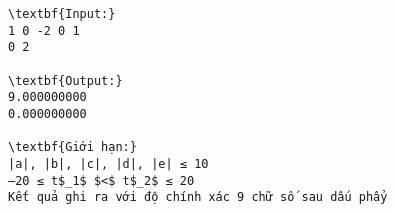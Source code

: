 \begin{verbatim}
\textbf{Input:}
1 0 -2 0 1
0 2

\textbf{Output:}
9.000000000
0.000000000

\textbf{Giới hạn:}
|a|, |b|, |c|, |d|, |e| ≤ 10
–20 ≤ t$_1$ $<$ t$_2$ ≤ 20
Kết quả ghi ra với độ chính xác 9 chữ số sau dấu phẩy
\end{verbatim}